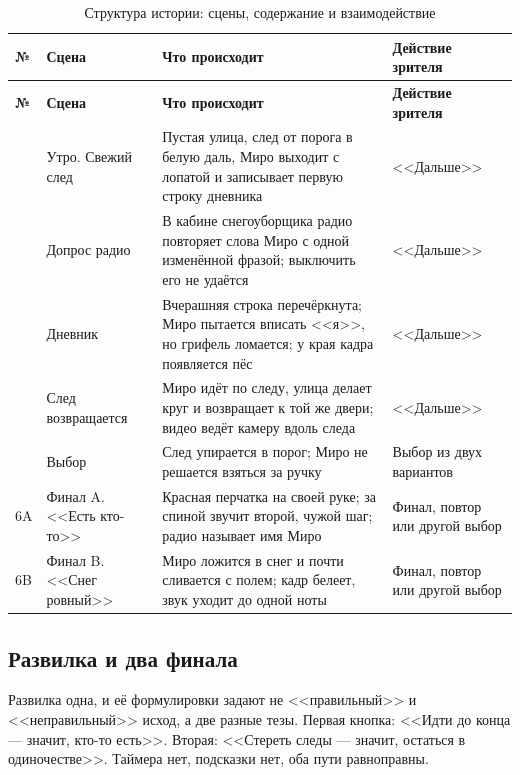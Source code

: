 \documentclass[12pt, a4paper]{article}
\begin{document}
\begin{small}
\setlength{\tabcolsep}{3pt}
\begin{longtable}{@{}L{1.0cm}L{3.4cm}L{7.3cm}L{3.5cm}@{}}
\caption{Структура истории: сцены, содержание и взаимодействие}\label{tab:scenes}\\
\toprule
\textbf{№} & \textbf{Сцена} & \textbf{Что происходит} & \textbf{Действие зрителя} \\
\midrule
\endfirsthead
\toprule
\textbf{№} & \textbf{Сцена} & \textbf{Что происходит} & \textbf{Действие зрителя} \\
\midrule
\endhead
\bottomrule
{} & Утро. Свежий след & Пустая улица, след от порога в белую даль, Миро выходит с лопатой и записывает первую строку дневника & <<Дальше>> \\
 & Допрос радио & В кабине снегоуборщика радио повторяет слова Миро с одной изменённой фразой; выключить его не удаётся & <<Дальше>> \\
 & Дневник & Вчерашняя строка перечёркнута; Миро пытается вписать <<я>>, но грифель ломается; у края кадра появляется пёс & <<Дальше>> \\
 & След возвращается & Миро идёт по следу, улица делает круг и возвращает к той же двери; видео ведёт камеру вдоль следа & <<Дальше>> \\
 & Выбор & След упирается в порог; Миро не решается взяться за ручку & Выбор из двух вариантов \\
\addlinespace
6A & Финал A. <<Есть кто-то>> & Красная перчатка на своей руке; за спиной звучит второй, чужой шаг; радио называет имя Миро & Финал, повтор или другой выбор \\
\addlinespace
6B & Финал B. <<Снег ровный>> & Миро ложится в снег и почти сливается с полем; кадр белеет, звук уходит до одной ноты & Финал, повтор или другой выбор \\
\end{longtable}
\end{small}

\subsection{Развилка и два финала}
Развилка одна, и её формулировки задают не <<правильный>> и <<неправильный>> исход, а две разные тезы. Первая кнопка: <<Идти до конца --- значит, кто-то есть>>. Вторая: <<Стереть следы --- значит, остаться в одиночестве>>. Таймера нет, подсказки нет, оба пути равноправны.
\end{document}
